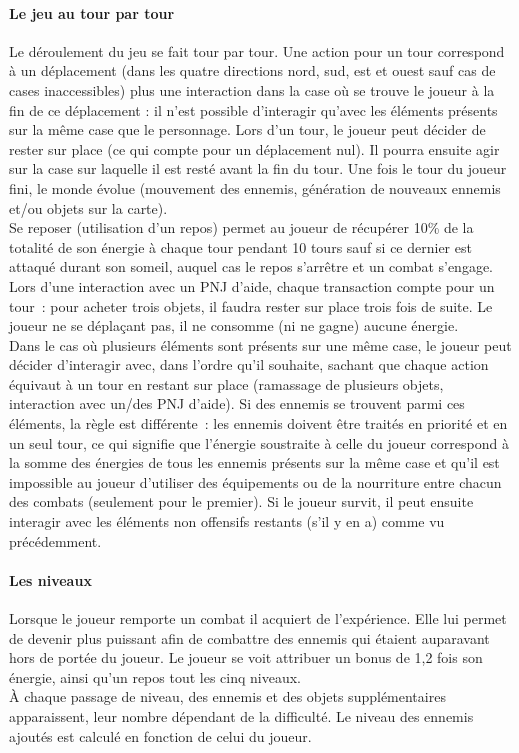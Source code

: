 \documentclass[11pt]{article}
\begin{document}
\paragraph{Le jeu au tour par tour}

Le déroulement du jeu se fait tour par tour. Une action pour un tour correspond à un déplacement (dans les quatre directions nord, sud, est et ouest sauf cas de cases inaccessibles) plus une interaction dans la case où se trouve le joueur à la fin de ce déplacement : il n'est possible d’interagir qu'avec les éléments présents sur la même case que le personnage. Lors d'un tour, le joueur peut décider de rester sur place (ce qui compte pour un déplacement nul). Il pourra ensuite agir sur la case sur laquelle il est resté avant la fin du tour. Une fois le tour du joueur fini, le monde évolue (mouvement des ennemis, génération de nouveaux ennemis et/ou objets sur la carte).\\
Se reposer (utilisation d'un repos) permet au joueur de récupérer 10\% de la totalité de son énergie à chaque tour pendant 10 tours sauf si ce dernier est attaqué durant son someil, auquel cas le repos s'arrêtre et un combat s'engage.\\
Lors d'une interaction avec un PNJ d'aide, chaque transaction compte pour un tour~: pour acheter trois objets, il faudra rester sur place trois fois de suite. Le joueur ne se déplaçant pas, il ne consomme (ni ne gagne) aucune énergie.\\
Dans le cas où plusieurs éléments sont présents sur une même case, le joueur peut décider d’interagir avec, dans l'ordre qu'il souhaite, sachant que chaque action équivaut à un tour en restant sur place (ramassage de plusieurs objets, interaction avec un/des PNJ d'aide). Si des ennemis se trouvent parmi ces éléments, la règle est différente~: les ennemis doivent être traités en priorité et en un seul tour, ce qui signifie que l'énergie soustraite à celle du joueur correspond à la somme des énergies de tous les ennemis présents sur la même case et qu'il est impossible au joueur d'utiliser des équipements ou de la nourriture entre chacun des combats (seulement pour le premier). Si le joueur survit, il peut ensuite interagir avec les éléments non offensifs restants (s'il y en a) comme vu précédemment.

\paragraph{Les niveaux}

Lorsque le joueur remporte un combat il acquiert de l’expérience. Elle lui permet de devenir plus puissant afin de combattre des ennemis qui étaient auparavant hors de portée du joueur.
Le joueur se voit attribuer un bonus de 1,2 fois son énergie, ainsi qu'un repos tout les cinq niveaux.\\
À chaque passage de niveau, des ennemis et des objets supplémentaires apparaissent, leur nombre dépendant de la difficulté. Le niveau des ennemis ajoutés est calculé en fonction de celui du joueur.
\end{document}
